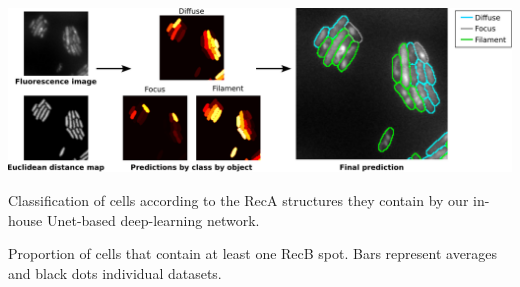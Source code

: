 \begin{suppfigure*}[htbp]
\begin{center}
\end{center}
\caption{}
\label{SIFig:frame_intervals}
\end{suppfigure*}


\begin{suppfigure*}[htbp]
\begin{center}
\includegraphics[width=\textwidth]{SI_Figures/ObjectClassifier.pdf}
\end{center}
\caption{Classification of cells according to the RecA structures they contain by our in-house Unet-based deep-learning network.}
\label{SIFig:object_class}
\end{suppfigure*}


\begin{suppfigure*}[htbp]
\begin{center}
\end{center}
\caption{Proportion of cells that contain at least one RecB spot. Bars represent averages and black dots individual datasets.}
\label{SIFig:cells_1spot}
\end{suppfigure*}
